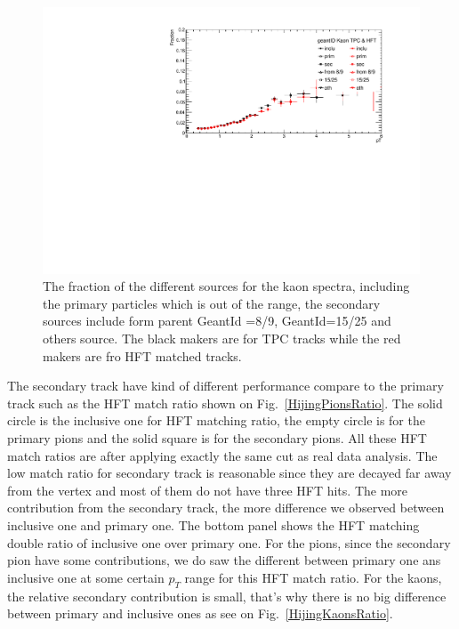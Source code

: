 \begin{figure}[htbp]
\centering
\includegraphics[keepaspectratio,width=1.0\textwidth,angle=0]{figure/Run14_D0HFT/Fraction_Kaon.pdf}
\caption{The fraction of the different sources for the kaon spectra, including the primary particles which is out of the range, the secondary sources include form parent GeantId =8/9, GeantId=15/25 and others source. The black makers are for TPC tracks while the red makers are fro HFT matched tracks.}
\label{Fraction_Kaon}
\end{figure}


The secondary track have kind of different performance compare to the primary track such as the HFT match ratio shown on Fig.~\ref{HijingPionsRatio}. The solid circle is the inclusive one for HFT matching ratio, the empty circle is for the primary pions and the solid square is for the secondary pions. All these HFT match ratios are after applying exactly the same cut as real data analysis. The low match ratio for secondary track is reasonable since they are decayed far away from the vertex and most of them do not have three HFT hits. The more contribution from the secondary track, the more difference we observed between inclusive one and primary one. The bottom panel shows the HFT matching double ratio of inclusive one over primary one. For the pions, since the secondary pion have some contributions, we do saw the different between primary one ans inclusive one at some certain $p_T$ range for this HFT match ratio. For the kaons, the relative secondary contribution is small, that's why there is no big difference between primary and inclusive ones as see on Fig.~\ref{HijingKaonsRatio}. 

